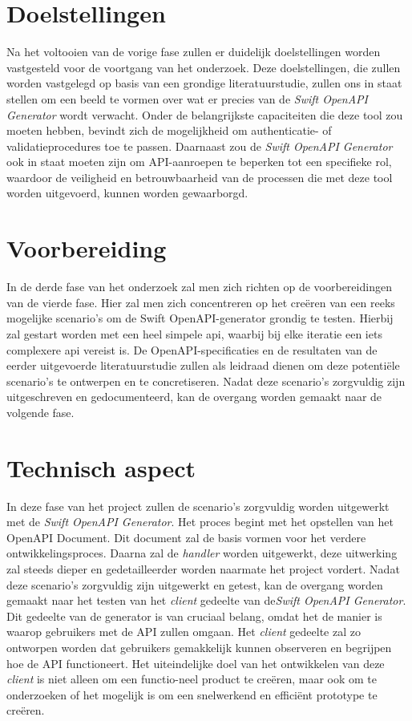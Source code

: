 \section{Doelstellingen}
Na het voltooien van de vorige fase zullen er duidelijk doelstellingen worden vastgesteld voor de voortgang van het onderzoek. Deze doelstellingen, die zullen worden vastgelegd op basis van een grondige literatuurstudie, zullen ons in staat stellen om een beeld te vormen over wat er precies van de \textit{Swift OpenAPI Generator} wordt verwacht. Onder de belangrijkste capaciteiten die deze tool zou moeten hebben, bevindt zich de mogelijkheid om authenticatie- of validatieprocedures toe te passen. Daarnaast zou de \textit{Swift OpenAPI Generator} ook in staat moeten zijn om API-aanroepen te beperken tot een specifieke rol, waardoor de veiligheid en betrouwbaarheid van de processen die met deze tool worden uitgevoerd, kunnen worden gewaarborgd.

\section{Voorbereiding}
In de derde fase van het onderzoek zal men zich richten op de voorbereidingen van de vierde fase. Hier zal men zich concentreren op het creëren van een reeks mogelijke scenario's om de Swift OpenAPI-generator grondig te testen. Hierbij zal gestart worden met een heel simpele api, waarbij bij elke iteratie een iets complexere api vereist is. De OpenAPI-specificaties en de resultaten van de eerder uitgevoerde literatuurstudie zullen als leidraad dienen om deze potentiële scenario's te ontwerpen en te concretiseren. Nadat deze scenario’s zorgvuldig zijn uitgeschreven en gedocumenteerd, kan de overgang worden gemaakt naar de volgende fase. 

\section{Technisch aspect}
In deze fase van het project zullen de scenario's zorgvuldig worden uitgewerkt met de \textit{Swift OpenAPI Generator}. Het proces begint met het opstellen van het OpenAPI Document. Dit document zal de basis vormen voor het verdere ontwikkelingsproces. Daarna zal de \textit{handler} worden uitgewerkt, deze uitwerking zal steeds dieper en gedetailleerder worden naarmate het project vordert.
Nadat deze scenario's zorgvuldig zijn uitgewerkt en getest, kan de overgang worden gemaakt naar het testen van het \textit{client} gedeelte van de\textit{Swift OpenAPI Generator}. Dit gedeelte van de generator is van cruciaal belang, omdat het de manier is waarop gebruikers met de API zullen omgaan. Het \textit{client} gedeelte zal zo ontworpen worden dat gebruikers gemakkelijk kunnen observeren en begrijpen hoe de API functioneert.
Het uiteindelijke doel van het ontwikkelen van deze \textit{client} is niet alleen om een functio-neel product te creëren, maar ook om te onderzoeken of het mogelijk is om een snelwerkend en efficiënt prototype te creëren. 


